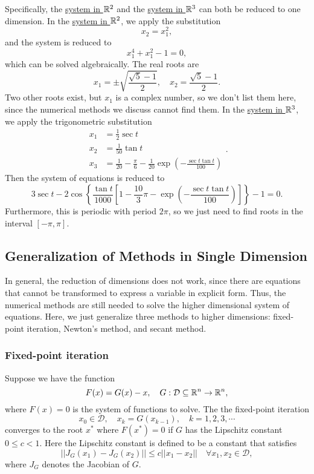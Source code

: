 \begin{table}[H]
Specifically, the \hyperref[eqn1]{system in \(\mathbb{R}^2\)} and the \hyperref[eqn3]{system in \(\mathbb{R}^3\)} can both be reduced to one dimension.
In the \hyperref[eqn1]{system in \(\mathbb{R}^2\)}, we apply the substitution
\[ x_2=x_1^2, \]
and the system is reduced to
\begin{equation}\label{eqn1reduce}
x_1^4+x_1^2-1=0,
\end{equation}
which can be solved algebraically.
The real roots are
\[ x_1=\pm\sqrt{\frac{\sqrt{5}-1}{2}}, \quad x_2=\frac{\sqrt{5}-1}{2}. \]
Two other roots exist, but \(x_1\) is a complex number, so we don't list them here, since the numerical methods we discuss cannot find them.
In the \hyperref[eqn2]{system in \(\mathbb{R}^3\)}, we apply the trigonometric substitution
\[ \begin{aligned} x_1&=\frac{1}{2}\sec t \\ x_2&=\frac{1}{50}\tan t\\
x_3&=\frac{1}{20}-\frac{\pi}{6}-\frac{1}{20}\exp\left(-\frac{\sec t\tan t}{100} \right) \end{aligned}. \]
Then the system of equations is reduced to
\begin{equation}\label{eqn2reduce}
3\sec t-2\cos\left\{ \frac{\tan t}{1000} \left[ 1-\frac{10}{3}\pi-\exp\left(-\frac{\sec t\tan t}{100} \right) \right] \right\}-1=0. 
\end{equation}
Furthermore, this is periodic with period \(2\pi\), so we just need to find roots in the interval \([-\pi,\pi]\).

\subsection{Generalization of Methods in Single Dimension}
In general, the reduction of dimensions does not work, since there are equations that cannot be transformed to express a variable in explicit form.
Thus, the numerical methods are still needed to solve the higher dimensional system of equations.
Here, we just generalize three methods to higher dimensions: fixed-point iteration,	Newton's method, and secant method.



\subsubsection{Fixed-point iteration}
Suppose we have the function
\[ F(x)=G(x)-x, \quad G:\mathcal{D}\subseteq\mathbb{R}^{n}\to\mathbb{R}^n, \]
where \(F(x)=0\) is the system of functions to solve.
The the fixed-point iteration
\[ x_0\in\mathcal{D}, \quad x_{k}=G(x_{k-1}), \quad k=1,2,3,\cdots  \]
converges to the root \(x^*\) where \(F(x^*)=0\) if \(G\) has the Lipschitz constant \(0\leq c<1\).
Here the Lipschitz constant is defined to be a constant that satisfies
\[ ||J_G(x_1)-J_G(x_2)|| \leq c ||x_1-x_2|| \quad \forall x_1,x_2\in\mathcal{D}, \]
where \(J_G\) denotes the Jacobian of \(G\).




\end{table}
